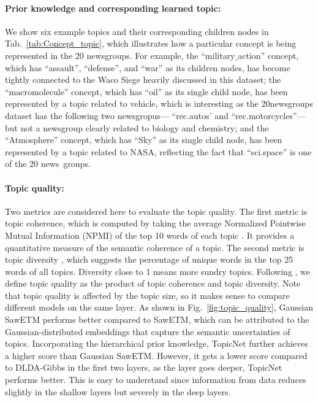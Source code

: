 \documentclass{article}
\begin{document}
\paragraph{Prior knowledge and corresponding learned topic:} 
We show six example topics %
and their corresponding children nodes in Tab.~\ref{tab:Concept_topic}, which illustrates how a particular concept is being represented in the 20 newsgroups. 
For example, the “military$\_$action” concept, which has “assault”, “defense”, 
and “war” as its children nodes, has become tightly connected to the Waco Siege heavily discussed in this dataset;
the “macromolecule” concept, which has “oil” as its single child node, has been represented by a topic related to vehicle, which is interesting as the 20newsgroups dataset has the following two newsgropus--- “rec.autos’ and “rec.motorcycles”---but not a newsgroup clearly related to biology and chemistry; and the “Atmosphere” concept, which has “Sky” as its single child node, has been represented by a topic related to NASA, reflecting the fact that “sci.space” is one of the 20 news~groups.


\paragraph{Topic quality:} Two metrics are considered here to evaluate the topic quality. The first metric is topic coherence, which is computed by taking the average Normalized Pointwise Mutual Information (NPMI) of the top 10 words of each topic \cite{aletras2013evaluating}. It provides a quantitative measure of the semantic coherence of a topic. The second metric is topic diversity \cite{dieng2020topic}, which suggests the percentage of unique words in the top 25 words of all topics. Diversity close to 1 means more sundry topics. Following \citet{dieng2020topic}, we define topic quality as the product of topic coherence and topic diversity. Note that topic quality is affected by the topic size, so it makes sense to compare different models on the same layer.  As shown in Fig.~\ref{fig:topic_quality}, Gaussian SawETM performs better compared to SawETM, which can be attributed to the Gaussian-distributed embeddings that capture the semantic uncertainties of topics. Incorporating the hierarchical prior knowledge, TopicNet further achieves a higher score than Gaussian SawETM. However, it gets a lower score compared to DLDA-Gibbs in the first two layers, as the layer goes deeper, TopicNet performs better. This is easy to understand since information from data reduces slightly in the shallow layers but severely in the deep layers. 
\end{document}
